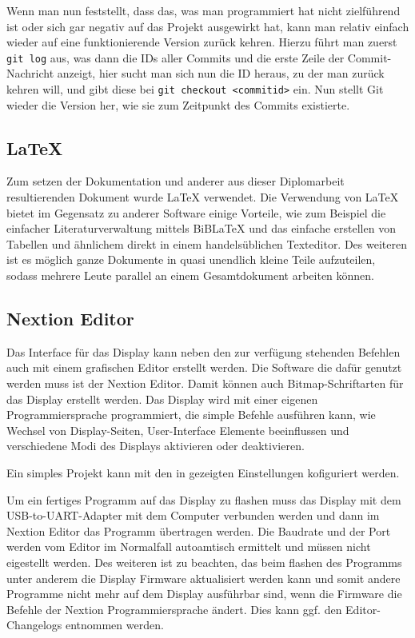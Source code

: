 Wenn man nun feststellt, dass das, was man programmiert hat nicht zielführend ist oder sich gar negativ auf das Projekt ausgewirkt hat, kann man relativ einfach wieder auf eine funktionierende Version zurück kehren. Hierzu führt man zuerst \texttt{git log} aus, was dann die IDs aller Commits und die erste Zeile der Commit-Nachricht anzeigt, hier sucht man sich nun die ID heraus, zu der man zurück kehren will, und gibt diese bei \texttt{git checkout <commitid>} ein. Nun stellt Git wieder die Version her, wie sie zum Zeitpunkt des Commits existierte.

\subsection{\LaTeX{}}
Zum setzen der Dokumentation und anderer aus dieser Diplomarbeit resultierenden Dokument wurde \LaTeX{} verwendet. Die Verwendung von \LaTeX{} bietet im Gegensatz zu anderer Software einige Vorteile, wie zum Beispiel die einfacher Literaturverwaltung mittels BiB\LaTeX{} und das einfache erstellen von Tabellen und ähnlichem direkt in einem handelsüblichen Texteditor. Des weiteren ist es möglich ganze Dokumente in quasi unendlich kleine Teile aufzuteilen, sodass mehrere Leute parallel an einem Gesamtdokument arbeiten können.

\subsection{Nextion Editor}
Das Interface für das Display kann neben den zur verfügung stehenden Befehlen auch mit einem grafischen Editor erstellt werden. Die Software die dafür genutzt werden muss ist der Nextion Editor. Damit können auch Bitmap-Schriftarten für das
Display erstellt werden. Das Display wird mit einer eigenen Programmiersprache programmiert, die simple Befehle ausführen kann, wie Wechsel von Display-Seiten, User-Interface Elemente beeinflussen und verschiedene Modi des Displays aktivieren
oder deaktivieren.

Ein simples Projekt kann mit den in  gezeigten Einstellungen kofiguriert werden.


Um ein fertiges Programm auf das Display zu flashen muss das Display mit dem \gls{USB-to-UART}-Adapter mit dem Computer verbunden werden und dann im Nextion Editor das Programm übertragen werden. Die Baudrate und der Port werden vom Editor im Normalfall autoamtisch ermittelt und müssen nicht eigestellt werden. Des weiteren ist zu beachten, das beim flashen des Programms unter anderem die Display Firmware aktualisiert werden kann und somit andere Programme nicht mehr auf dem Display ausführbar sind, wenn die Firmware die Befehle der Nextion Programmiersprache ändert. Dies kann ggf. den Editor-Changelogs entnommen werden.

